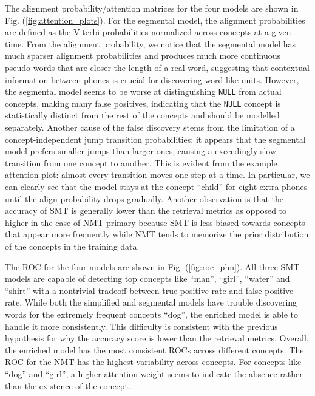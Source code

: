\documentclass[journal]{IEEEtran}
\begin{document}
The alignment probability/attention matrices for the four models are shown in Fig. (\ref{fig:attention_plots}). For the segmental model, the alignment probabilities are defined as the Viterbi probabilities normalized across concepts at a given time.  From the alignment probability, we notice that the segmental model has much sparser alignment probabilities and produces much more continuous pseudo-words that are closer the length of a real word, suggesting that contextual information between phones is crucial for discovering word-like units. However, the segmental model seems to be worse at distinguishing \texttt{NULL} from actual concepts, making many false positives, indicating that the \texttt{NULL} concept is statistically distinct from the rest of the concepts and should be modelled separately. Another cause of the false discovery stems from the limitation of a concept-independent jump transition probabilities: it appears that the segmental model prefers smaller jumps than larger ones, causing a exceedingly slow transition from one concept to another. This is evident from the example attention plot: almost every transition moves one step at a time. In particular, we can clearly see that the model stays at the concept ``child'' for eight extra phones until the align probability drops gradually. Another observation is that the accuracy of SMT is generally lower than the retrieval metrics as opposed to higher in the case of NMT primary because SMT is less biased towards concepts that appear more frequently while NMT tends to memorize the prior distribution of the concepts in the training data.

The ROC for the four models are shown in Fig. (\ref{fig:roc_phn}). All three SMT models are capable of detecting top concepts like ``man'', ``girl'', ``water'' and ``shirt'' with a nontrivial tradeoff between true positive rate and false positive rate. While both the simplified and segmental models have trouble discovering words for the extremely frequent concepts ``dog'', the enriched model is able to handle it more consistently. This difficulty is consistent with the previous hypothesis for why the accuracy score is lower than the retrieval metrics. Overall, the enriched model has the most consistent ROCs across different concepts. The ROC for the NMT has the highest variability across concepts. For concepts like ``dog'' and ``girl'', a higher attention weight seems to indicate the absence rather than the existence of the concept.    
\end{document}
